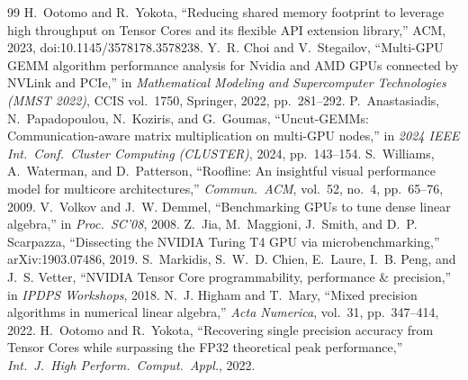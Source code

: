 \documentclass[conference]{IEEEtran}
\begin{document}
\begin{thebibliography}{99}
 H.~Ootomo and R.~Yokota, ``Reducing shared memory footprint to leverage high throughput on Tensor Cores and its flexible API extension library,'' ACM, 2023, doi:10.1145/3578178.3578238.
 Y.~R. Choi and V.~Stegailov, ``Multi-GPU GEMM algorithm performance analysis for Nvidia and AMD GPUs connected by NVLink and PCIe,'' in \emph{Mathematical Modeling and Supercomputer Technologies (MMST 2022)}, CCIS vol.~1750, Springer, 2022, pp.~281--292.
 P.~Anastasiadis, N.~Papadopoulou, N.~Koziris, and G.~Goumas, ``Uncut-GEMMs: Communication-aware matrix multiplication on multi-GPU nodes,'' in \emph{2024 IEEE Int.\ Conf.\ Cluster Computing (CLUSTER)}, 2024, pp.~143--154.
 S.~Williams, A.~Waterman, and D.~Patterson, ``Roofline: An insightful visual performance model for multicore architectures,'' \emph{Commun.\ ACM}, vol.~52, no.~4, pp.~65--76, 2009.
 V.~Volkov and J.~W. Demmel, ``Benchmarking GPUs to tune dense linear algebra,'' in \emph{Proc.\ SC'08}, 2008.
 Z.~Jia, M.~Maggioni, J.~Smith, and D.~P. Scarpazza, ``Dissecting the NVIDIA Turing T4 GPU via microbenchmarking,'' arXiv:1903.07486, 2019.
 S.~Markidis, S.~W.~D. Chien, E.~Laure, I.~B. Peng, and J.~S. Vetter, ``NVIDIA Tensor Core programmability, performance \& precision,'' in \emph{IPDPS Workshops}, 2018.
 N.~J. Higham and T.~Mary, ``Mixed precision algorithms in numerical linear algebra,'' \emph{Acta Numerica}, vol.~31, pp.~347--414, 2022.
 H.~Ootomo and R.~Yokota, ``Recovering single precision accuracy from Tensor Cores while surpassing the FP32 theoretical peak performance,'' \emph{Int.\ J.\ High Perform.\ Comput.\ Appl.}, 2022.
\end{thebibliography}
\end{document}
